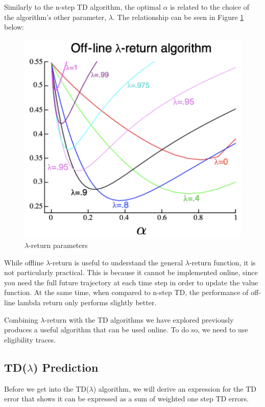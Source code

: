 \documentclass[11pt]{article}
\begin{document}
Similarly to the n-step TD algorithm, the optimal $\alpha$ is related to the choice of the algorithm's other parameter, $\lambda$. The relationship can be seen in Figure \ref{fig:lambda-return_params} below:

\begin{figure}[H]
    \centering
    \includegraphics[width=0.35\linewidth]{images/lambda-return_params.png}
    \caption{$\lambda$-return parameters}
    \label{fig:lambda-return_params}
\end{figure}

While offline $\lambda$-return is useful to understand the general $\lambda$-return function, it is not particularly practical. This is because it cannot be implemented online, since you need the full future trajectory at each time step in order to update the value function. At the same time, when compared to n-step TD, the performance of off-line lambda return only performs slightly better. 

Combining $\lambda$-return with the TD algorithms we have explored previously produces a useful algorithm that can be used online. To do so, we need to use eligibility traces. 

\subsection{TD($\lambda$) Prediction}

Before we get into the TD($\lambda$) algorithm, we will derive an expression for the TD error that shows it can be expressed as a sum of weighted one step TD errors.
\end{document}
